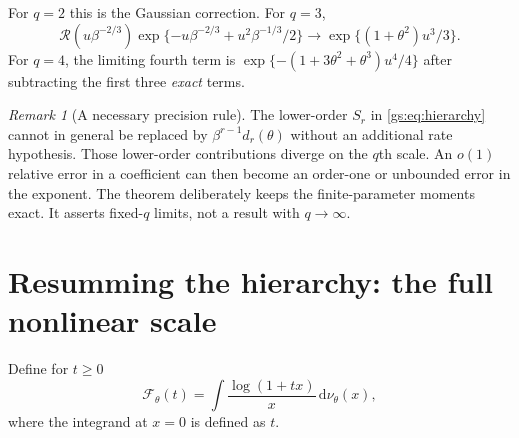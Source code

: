 \documentclass[11pt,a4paper]{article}
\numberwithin{equation}{section}
\theoremstyle{definition}
\theoremstyle{remark}
\newtheorem{remark}[theorem]{Remark}
\newcommand{\dd}{\mathrm d}
\newcommand{\Rgs}{\mathcal R}
\newcommand{\calF}{\mathcal F}
\begin{document}
For $q=2$ this is the Gaussian correction. For $q=3$,
\begin{equation}\label{gs:eq:cubic-limit}
 \Rgs(u\beta^{-2/3})
 \exp\{-u\beta^{-2/3}+u^2\beta^{-1/3}/2\}
 \longrightarrow \exp\{(1+\theta^2)u^3/3\}.
\end{equation}
For $q=4$, the limiting fourth term is
$\exp\{-(1+3\theta^2+\theta^3)u^4/4\}$ after subtracting the first
three \emph{exact} terms.

\begin{remark}[A necessary precision rule]
The lower-order $S_r$ in \eqref{gs:eq:hierarchy} cannot in general be replaced
by $\beta^{r-1}d_r(\theta)$ without an additional rate hypothesis.
Those lower-order contributions diverge on the $q$th scale. An $o(1)$
relative error in a coefficient can then become an order-one or unbounded
error in the exponent. The theorem deliberately keeps the finite-parameter
moments exact. It asserts fixed-$q$ limits, not a result with $q\to\infty$.
\end{remark}

\section{Resumming the hierarchy: the full nonlinear scale}
\label{gs:sec:freeenergy}

Define for $t\ge0$
\begin{equation}\label{gs:eq:F-integral}
 \calF_\theta(t)=\int\frac{\log(1+tx)}x\,\dd\nu_\theta(x),
\end{equation}
where the integrand at $x=0$ is defined as $t$.
\end{document}
